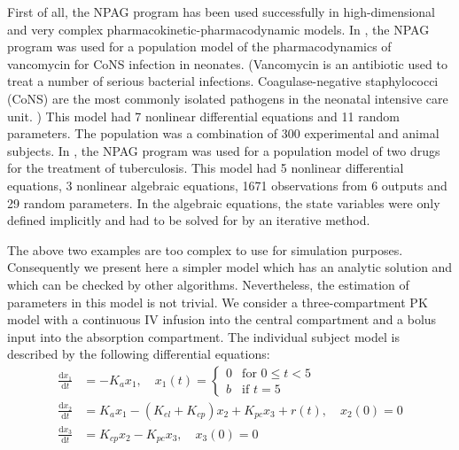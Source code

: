 
First of all, the NPAG program has been used successfully in high-dimensional and very complex pharmacokinetic-pharmacodynamic models.
%
In \citet{Ramos16}, the NPAG program was used for a population model of the pharmacodynamics of vancomycin for CoNS infection in neonates.
(Vancomycin is an antibiotic used to treat a number of serious bacterial infections. Coagulase-negative staphylococci (CoNS) are the most commonly isolated pathogens in the neonatal intensive care unit. )
% 
This model had 7 nonlinear differential equations and 11 random parameters.
%
The population was a combination of 300 experimental and animal subjects.
%
In \citet{Drusano14}, the NPAG program was used for a population model of two drugs for the treatment of tuberculosis.  This model had 5 nonlinear differential equations, 3 nonlinear algebraic equations, 1671 observations from 6 outputs and 29 random parameters. In the algebraic equations, the state variables were only defined implicitly and had to be solved for by an iterative method. 

The above two examples are too complex to use for simulation purposes.
%
Consequently we present here a simpler model which has an analytic solution and which can be checked by other algorithms. Nevertheless, the estimation of parameters in this model is not trivial. 
%
We consider a three-compartment PK model with a continuous IV infusion into the central compartment and a bolus input into the absorption compartment.
%
The individual subject model is described by the following differential equations:
\begin{align}
\frac{\mathrm{d}x_1}{\mathrm{d}t} & = -K_{a} x_1,  \quad  
		x_1(t) =
		\begin{cases}
			0 & \mbox{for $0 \le t < 5$}  \\
			b & \mbox{if $t = 5$}
		\end{cases} \nonumber \\
\frac{\mathrm{d}x_2}{\mathrm{d}t} & = K_{a} x_1- \left( K_{el}+K_{cp} \right) x_2 +K_{pc} x_3 + r(t), \quad  x_2(0)=0 \nonumber \\
\frac{\mathrm{d}x_3}{\mathrm{d}t} & = K_{cp} x_2 - K_{pc} x_3,  \quad x_3(0) = 0 \nonumber 
\end{align}


